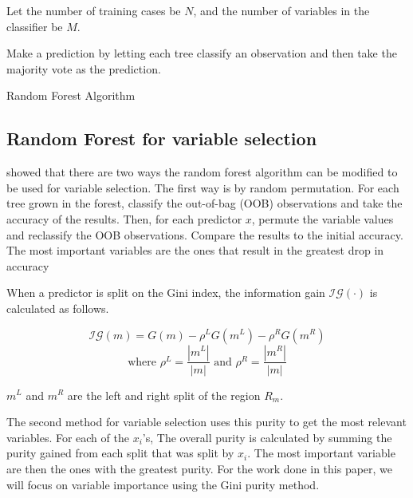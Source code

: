 \documentclass[twoside,11pt]{article}
\begin{document}
\begin{algorithm}
Let the number of training cases be $N$, and the number of variables in the classifier be $M$.

Make a prediction by letting each tree classify an observation and then take the majority vote as the prediction.
\caption{Random Forest Algorithm}\label{algo: RandomForest}
\end{algorithm}

\subsection{Random Forest for variable selection}
\citet{Breiman01} showed that there are two ways the random forest algorithm can be modified to be used for variable selection. The first way is by random permutation. For each tree grown in the forest, classify the out-of-bag (OOB) observations and take the accuracy of the results. Then, for each predictor $x$, permute the variable values and reclassify the OOB observations. Compare the results to the initial accuracy. The most important variables are the ones that result in the greatest drop in accuracy

When a predictor is split on the Gini index, the information gain $\mathcal{IG}(\cdot)$ is calculated as follows. 

\begin{equation}\label{eqn:Delta Function}
	\mathcal{IG}(m)=G(m)-\rho^L G(m^L)-\rho^R G(m^R) 
\end{equation}
\begin{equation}
	\text{where } \rho^L = \frac{|m^L|}{|m|} \text{ and } \rho^R = \frac{|m^R|}{|m|}
\end{equation}
	



$m^L$ and $m^R$ are the left and right split of the region $R_m$. 

The second method for variable selection uses this purity to get the most relevant variables. For each of the $x_i$'s, The overall purity is calculated by summing the purity gained from each split that was split by $x_i$. The most important variable are then the ones with the greatest purity. For the work done in this paper, we will focus on variable importance using the Gini purity method. 	
\end{document}
